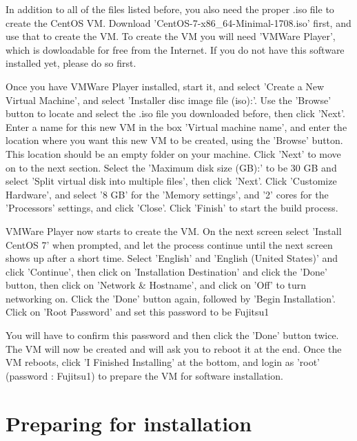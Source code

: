 \begin{myindent}
In addition to all of the files listed before, you also need the proper .iso file to create the CentOS VM.
Download 'CentOS-7-x86\_64-Minimal-1708.iso' first, and use that to create the VM.
To create the VM you will need 'VMWare Player', which is dowloadable for free from the Internet. If you do not have
this software installed yet, please do so first.
\newline

\noindent Once you have VMWare Player installed, start it, and select 'Create a New Virtual Machine', and select 'Installer disc image file (iso):'.
Use the 'Browse' button to locate and select the .iso file you downloaded before, then click 'Next'.
Enter a name for this new VM in the box 'Virtual machine name', and enter the location where you want this new VM to be created, using the 'Browse' button.
This location should be an empty folder on your machine. Click 'Next' to move on to the next section.
Select the 'Maximum disk size (GB):' to be 30 GB and select 'Split virtual disk into multiple files', then click 'Next'.
Click 'Customize Hardware', and select '8 GB' for the 'Memory settings', and '2' cores for the 'Processors' settings, and click 'Close'.
Click 'Finish' to start the build process.
\newline

\noindent VMWare Player now starts to create the VM. On the next screen select 'Install CentOS 7' when prompted, and let the process continue until the next screen shows up after a short time.
Select 'English' and 'English (United States)' and click 'Continue', then click on 'Installation Destination' and click the 'Done' button, then click on 'Network \& Hostname', and click on 'Off' to turn networking on.
Click the 'Done' button again, followed by 'Begin Installation'.
Click on 'Root Password' and set this password to be Fujitsu1
\newline

\noindent You will have to confirm this password and then click the 'Done' button twice.
The VM will now be created and will ask you to reboot it at the end.
Once the VM reboots, click 'I Finished Installing' at the bottom, and login as 'root' (password : Fujitsu1) to prepare the VM for software installation.
\end{myindent}

{\let\clearpage\relax\par \chapter{Preparing for installation}}

